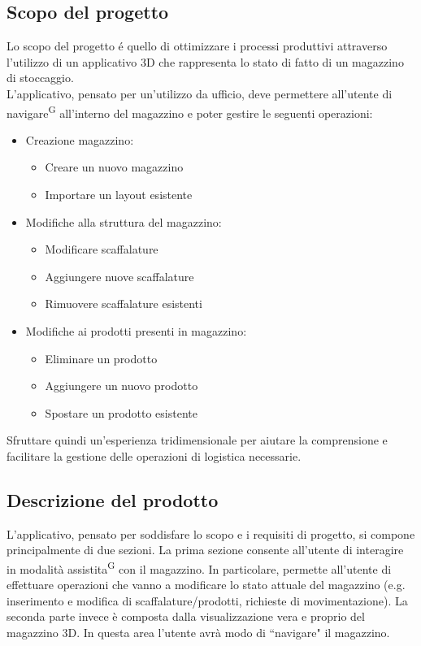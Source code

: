 \subsection{Scopo del progetto}\label{sec:scopo_del_progetto}
Lo scopo del progetto é quello di ottimizzare i processi produttivi attraverso l'utilizzo di 
un applicativo 3D che rappresenta lo stato di fatto di un magazzino di stoccaggio.\\
L'applicativo, pensato per un'utilizzo da ufficio, deve permettere all'utente di navigare\textsuperscript{G} all'interno 
del magazzino e poter gestire le seguenti operazioni:
\begin{itemize}
    \item Creazione magazzino:
        \begin{itemize}
            \item Creare un nuovo magazzino
            \item Importare un layout esistente
        \end{itemize}
    \item Modifiche alla struttura del magazzino:
        \begin{itemize}
            \item Modificare scaffalature
            \item Aggiungere nuove scaffalature
            \item Rimuovere scaffalature esistenti
        \end{itemize}
    \item Modifiche ai prodotti presenti in magazzino:
        \begin{itemize}
            \item Eliminare un prodotto
            \item Aggiungere un nuovo prodotto
            \item Spostare un prodotto esistente 
        \end{itemize}
\end{itemize}
Sfruttare quindi un'esperienza tridimensionale per aiutare la comprensione e facilitare la gestione delle 
operazioni di logistica necessarie. 


\subsection{Descrizione del prodotto}\label{sec:descrizione_del_prodotto}
L'applicativo, pensato per soddisfare lo scopo e i requisiti di progetto, si compone principalmente di due sezioni. 
La prima sezione consente all'utente di interagire in modalità assistita\textsuperscript{G} con il magazzino. In particolare, permette all'utente di effettuare operazioni che vanno a modificare lo stato attuale del magazzino (e.g. inserimento e modifica di scaffalature/prodotti, richieste di movimentazione). 
La seconda parte invece è composta dalla visualizzazione vera e proprio del magazzino 3D. In questa area l'utente avrà modo di ``navigare" il magazzino. 

